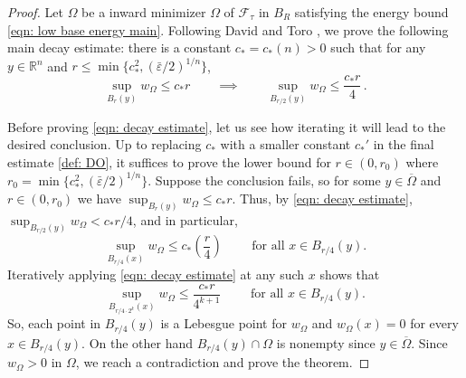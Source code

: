 \documentclass[10pt, reqno]{amsart}
\numberwithin{equation}{section}
\def\R{{\mathbb R}}
\def\e{\varepsilon}
\def\W{\Omega}
\def\err{\tau}
\def\Ep{\mathcal{F}_{\err}}
\def\baryEps{\bar{\e}}
\begin{document}
\begin{proof}
%
Let $\W$ be a inward minimizer $\W$ of $\Ep$ in $B_R$ satisfying the energy bound \eqref{eqn: low base energy main}. 
%
Following David and Toro \cite{DT15}, we prove the following main decay estimate: there is a constant  $c_*=c_*(n)>0$ such that for any $y \in \R^n$ and  $r \leq \min\{c_*^2, (\baryEps /2)^{1/n}\}$,
%
\begin{equation}\label{eqn: decay estimate}
\sup_{B_r(y)} w_\W \leq c_* r\qquad \implies \qquad \sup_{B_{r/2}(y)} w_\W \leq \frac{c_* r}{4}\,.
\end{equation}

Before proving \eqref{eqn: decay estimate}, let us see how iterating it will lead to the desired conclusion. 
%
Up to replacing $c_*$ with a smaller constant $c_*'$ in the final estimate \eqref{def: DO}, it suffices to prove the lower bound for $r \in (0, r_0)$ where $r_0 = \min\{c_*^2, (\baryEps /2)^{1/n}\}.$
%
Suppose the conclusion fails, so for some $y\in \overline{\Omega}$ and $r \in(0,r_0)$ we have $\sup_{B_{r}(y)} w_\W  \leq c_* r.$ Thus, by \eqref{eqn: decay estimate}, $\sup_{B_{r/2}(y)} w_\W< c_*r/4$, and in particular, 
\[
\sup_{B_{r/4}(x)} w_\W \leq c_*\left(\frac{r}{4} \right)\qquad \text{ for all } x \in B_{r/4}(y).
\]
Iteratively applying \eqref{eqn: decay estimate} at any such $x$ shows that 
\[
\sup_{{B_{r/4\cdot 2^k}(x)}} w_\W \leq\frac{c_* r}{4^{k+1}} \qquad \text{ for all } x \in B_{r/4}(y).
\]
So, each point in $B_{r/4}(y)$ is a Lebesgue point for $w_\W$ and $w_\W(x)= 0$ for every $x\in B_{r/4}(y)$. On the other hand $B_{r/4}(y)\cap \W$ is nonempty since $y \in \overline{\W}$. Since $w_\W >0$ in $\Omega$, we reach a contradiction and prove the theorem.

\smallskip


\end{proof}
\end{document}
